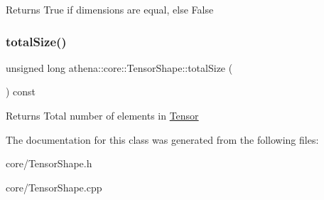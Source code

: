 \begin{DoxyReturn}{Returns}
True if dimensions are equal, else False 
\end{DoxyReturn}
\mbox{\label{classathena_1_1core_1_1_tensor_shape_a81219fb0b0e3e6852cb02fbbcf059882}} 
\subsubsection{\texorpdfstring{total\+Size()}{totalSize()}}
{\footnotesize\ttfamily unsigned long athena\+::core\+::\+Tensor\+Shape\+::total\+Size (\begin{DoxyParamCaption}{ }\end{DoxyParamCaption}) const}

\begin{DoxyReturn}{Returns}
Total number of elements in \mbox{\hyperlink{classathena_1_1core_1_1_tensor}{Tensor}} 
\end{DoxyReturn}


The documentation for this class was generated from the following files\+:\begin{DoxyCompactItemize}
\item 
core/Tensor\+Shape.\+h\item 
core/Tensor\+Shape.\+cpp\end{DoxyCompactItemize}
